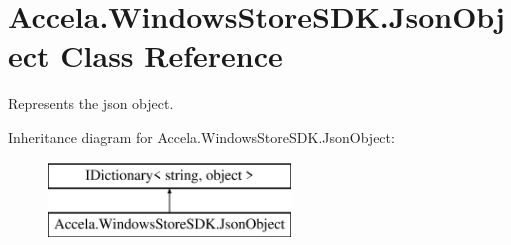 \hypertarget{class_accela_1_1_windows_store_s_d_k_1_1_json_object}{\section{Accela.\+Windows\+Store\+S\+D\+K.\+Json\+Object Class Reference}
\label{class_accela_1_1_windows_store_s_d_k_1_1_json_object}
}


Represents the json object.  


Inheritance diagram for Accela.\+Windows\+Store\+S\+D\+K.\+Json\+Object\+:\begin{figure}[H]
\begin{center}
\leavevmode
\includegraphics[height=2.000000cm]{class_accela_1_1_windows_store_s_d_k_1_1_json_object}
\end{center}
\end{figure}
